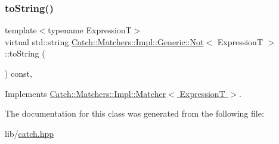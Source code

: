 \hypertarget{class_catch_1_1_matchers_1_1_impl_1_1_generic_1_1_not_ab970a4a6e58a987451e0b0e0e60a0bff}{}\label{class_catch_1_1_matchers_1_1_impl_1_1_generic_1_1_not_ab970a4a6e58a987451e0b0e0e60a0bff} 
\subsubsection{\texorpdfstring{to\+String()}{toString()}}
{\footnotesize\ttfamily template$<$typename ExpressionT$>$ \\
virtual std\+::string \hyperlink{class_catch_1_1_matchers_1_1_impl_1_1_generic_1_1_not}{Catch\+::\+Matchers\+::\+Impl\+::\+Generic\+::\+Not}$<$ ExpressionT $>$\+::to\+String (\begin{DoxyParamCaption}{ }\end{DoxyParamCaption}) const\hspace{0.3cm}{\ttfamily [inline]}, {\ttfamily [virtual]}}



Implements \hyperlink{struct_catch_1_1_matchers_1_1_impl_1_1_matcher_a091bcc37e589967d7e10fc7790d820e2}{Catch\+::\+Matchers\+::\+Impl\+::\+Matcher$<$ Expression\+T $>$}.



The documentation for this class was generated from the following file\+:\begin{DoxyCompactItemize}
\item 
lib/\hyperlink{catch_8hpp}{catch.\+hpp}\end{DoxyCompactItemize}
